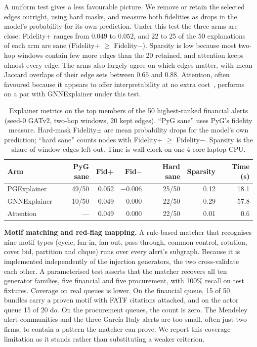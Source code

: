 \documentclass[conference]{IEEEtran}
\begin{document}
A uniform test gives a less favourable picture. We remove or retain the selected edges outright, using hard masks, and measure
both fidelities as drops in the model's probability for its own prediction.
Under this test the three arms are close: Fidelity+ ranges from $0.049$ to
$0.052$, and 22 to 25 of the 50 explanations of each arm are sane
(Fidelity+ $\geq$ Fidelity$-$). Sparsity is low
because most two-hop windows contain few more edges than the 20 retained, and
attention keeps almost every edge. The arms also largely agree on which edges
matter, with mean Jaccard overlaps of their edge sets between $0.65$ and
$0.88$. Attention, often favoured because it appears to offer interpretability
at no extra cost~\cite{jain2019}, performs on a par with GNNExplainer under
this test.

\begin{table}[t]
\caption{Explainer metrics on the top members of the 50 highest-ranked
financial alerts (seed-0 GATv2, two-hop windows, 20 kept edges). ``PyG sane''
uses PyG's fidelity measure. Hard-mask Fidelity$\pm$ are mean probability
drops for the model's own prediction; ``hard sane'' counts nodes with
Fidelity+ $\geq$ Fidelity$-$. Sparsity is the share of window edges left out.
Time is wall-clock on one 4-core laptop CPU.}
\label{tab:explainers}
\centering
\footnotesize
\setlength{\tabcolsep}{2.5pt}
\begin{tabular}{lrrrrrr}
\toprule
Arm & PyG sane & Fid+ & Fid$-$ & Hard sane & Sparsity & Time (s) \\
\midrule
PGExplainer & 49/50 & 0.052 & $-0.006$ & 25/50 & 0.12 & 18.1 \\
GNNExplainer & 10/50 & 0.049 & 0.000 & 22/50 & 0.29 & 57.8 \\
Attention & --- & 0.049 & 0.000 & 22/50 & 0.01 & 0.6 \\
\bottomrule
\end{tabular}
\end{table}

\textbf{Motif matching and red-flag mapping.} A rule-based matcher that
recognises nine motif types (cycle, fan-in, fan-out, pass-through, common
control, rotation, cover bid, partition and clique) runs over every alert's
subgraph. Because it is implemented independently of the injection generators, the two
cross-validate each other. A parameterised test asserts that the matcher
recovers all ten generator families, five financial and five procurement, with
100\% recall on test fixtures. Coverage on real queues is
lower. On the financial queue, 15 of 50 bundles carry a proven motif with FATF
citations attached, and on the actor queue 15 of 20 do. On the procurement
queues, the count is zero. The Mendeley alert communities and the three
Garc\'ia Italy alerts are too small, often just two firms, to contain a pattern
the matcher can prove. We report this coverage limitation as it stands rather
than substituting a weaker criterion.
\end{document}
